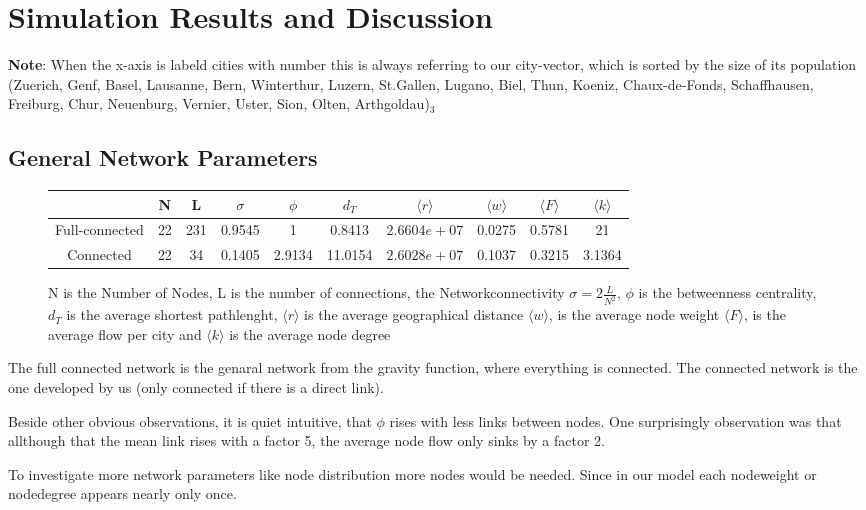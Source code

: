 \documentclass[11pt]{article}
\begin{document}
\section{Simulation Results and Discussion}
\textbf{Note}: When the x-axis is labeld cities with number this is always referring to our city-vector, which is sorted by the size of its population (Zuerich, Genf, Basel, Lausanne, Bern, Winterthur, Luzern, St.Gallen, Lugano, Biel, Thun, Koeniz, Chaux-de-Fonds, Schaffhausen, Freiburg, Chur, Neuenburg, Vernier, Uster, Sion, Olten, Arthgoldau)$_{3}$


\subsection{General Network Parameters}
\begin{figure}[h]
\begin{tabular}{c|c|c|c|c|c|c|c|c|c|}
 & N & L & $\sigma$ & $\phi$ & $d_T$ & $\langle r\rangle$ & 
 $\langle w\rangle$ & $\langle F\rangle$&$\langle k\rangle$ \\\hline
 Full-connected & 22 & 231 &0.9545&1& 0.8413& $2.6604e+07$&0.0275&0.5781& 21\\\hline
 
 Connected & 22 & 34 &    0.1405&2.9134& 11.0154&$2.6028e+07$&0.1037&0.3215& 3.1364\\\hline
\end{tabular}
\caption{N is the Number of Nodes, L is the number of connections, the Networkconnectivity $\sigma=2\frac{L}{N^2}$, $\phi$ is the betweenness centrality, $d_T$ is the average shortest pathlenght,  $\langle r\rangle$ is the average geographical distance  
 $\langle w\rangle$, is the average node weight $\langle F\rangle$, is the average flow per city and $\langle k\rangle$ is the average node degree}
\end{figure}

The full connected network is the genaral network from the gravity function, where everything is connected. The connected network is the one developed by us (only connected if there is a direct link).

Beside other obvious observations, it is quiet intuitive, that $\phi$ rises with less links between nodes. One surprisingly observation was that allthough that the mean link rises with a factor 5, the average node flow only sinks by a factor 2.\newline

To investigate more network parameters like node distribution more nodes would be needed. Since in our model each nodeweight or nodedegree appears nearly only once.
\end{document}
